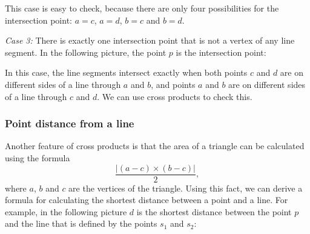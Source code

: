 This case is easy to check, because
there are only four possibilities
for the intersection point:
$a=c$, $a=d$, $b=c$ and $b=d$.

\textit{Case 3:}
There is exactly one intersection point
that is not a vertex of any line segment.
In the following picture, the point $p$
is the intersection point:
\begin{center}
\end{center}

In this case, the line segments intersect
exactly when both points $c$ and $d$ are
on different sides of a line through $a$ and $b$,
and points $a$ and $b$ are on different
sides of a line through $c$ and $d$.
We can use cross products to check this.

\subsubsection{Point distance from a line}

Another feature of cross products is that
the area of a triangle can be calculated
using the formula
\[\frac{| (a-c) \times (b-c) |}{2},\]
where $a$, $b$ and $c$ are the vertices of the triangle.
Using this fact, we can derive a formula
for calculating the shortest distance between a point and a line.
For example, in the following picture $d$ is the
shortest distance between the point $p$ and the line
that is defined by the points $s_1$ and $s_2$:
\begin{center}
\end{center}

